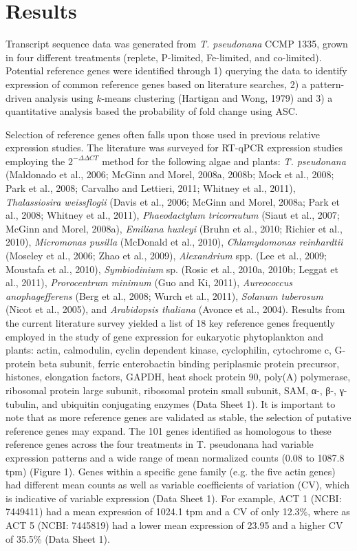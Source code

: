 \section{Results}
Transcript sequence data was generated from \textit{T. pseudonana} CCMP 1335, grown in four different treatments (replete, P-limited, Fe-limited, and co-limited). Potential reference genes were identified through 1) querying the data to identify expression of common reference genes based on literature searches, 2) a pattern-driven analysis using $k$-means clustering (Hartigan and Wong, 1979) and 3) a quantitative analysis based the probability of fold change using ASC. \par
Selection of reference genes often falls upon those used in previous relative expression studies. The literature was surveyed for RT-qPCR expression studies employing the $2^{- \Delta \Delta CT}$ method for the following algae and plants: \textit{T. pseudonana} (Maldonado et al., 2006; McGinn and Morel, 2008a, 2008b; Mock et al., 2008; Park et al., 2008; Carvalho and Lettieri, 2011; Whitney et al., 2011), \textit{Thalassiosira weissflogii} (Davis et al., 2006; McGinn and Morel, 2008a; Park et al., 2008; Whitney et al., 2011), \textit{Phaeodactylum tricornutum} (Siaut et al., 2007; McGinn and Morel, 2008a), \textit{Emiliana huxleyi} (Bruhn et al., 2010; Richier et al., 2010), \textit{Micromonas pusilla} (McDonald et al., 2010), \textit{Chlamydomonas reinhardtii} (Moseley et al., 2006; Zhao et al., 2009), \textit{Alexandrium} spp. (Lee et al., 2009; Moustafa et al., 2010), \textit{Symbiodinium} sp. (Rosic et al., 2010a, 2010b; Leggat et al., 2011), \textit{Prorocentrum minimum} (Guo and Ki, 2011), \textit{Aureococcus anophagefferens} (Berg et al., 2008; Wurch et al., 2011), \textit{Solanum tuberosum} (Nicot et al., 2005), and \textit{Arabidopsis thaliana} (Avonce et al., 2004). Results from the current literature survey yielded a list of 18 key reference genes frequently employed in the study of gene expression for eukaryotic phytoplankton and plants: actin, calmodulin, cyclin dependent kinase, cyclophilin, cytochrome c, G-protein beta subunit, ferric enterobactin binding periplasmic protein precursor, histones, elongation factors, GAPDH, heat shock protein 90, poly(A) polymerase, ribosomal protein large subunit, ribosomal protein small subunit, SAM, α-, β-, γ-tubulin, and ubiquitin conjugating enzymes (Data Sheet 1). It is important to note that as more reference genes are validated as stable, the selection of putative reference genes may expand. The 101 genes identified as homologous to these reference genes across the four treatments in T. pseudonana had variable expression patterns and a wide range of mean normalized counts (0.08 to 1087.8 tpm) (Figure 1). Genes within a specific gene family (e.g. the five actin genes) had different mean counts as well as variable coefficients of variation (CV), which is indicative of variable expression (Data Sheet 1). For example, ACT 1 (NCBI: 7449411) had a mean expression of 1024.1 tpm and a CV of only 12.3\%, where as ACT 5 (NCBI: 7445819) had a lower mean expression of 23.95 and a higher CV of 35.5\% (Data Sheet 1). \par
